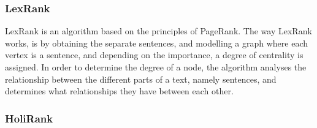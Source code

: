 \subsubsection{LexRank}
LexRank\cite{Erkan:2004:LGL:1622487.1622501} is an algorithm based on the principles of PageRank\cite{ilprints422}. The way LexRank works, is by obtaining the separate sentences, and modelling a graph where each vertex is a sentence, and depending on the importance, a degree of centrality is assigned. In order to determine the degree of a node, the algorithm analyses the relationship between the different parts of a text, namely sentences, and determines what relationships they have between each other. 
\subsubsection{HoliRank}
